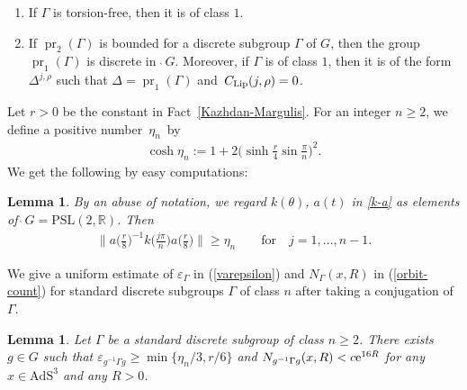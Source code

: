 \documentclass[10pt,a4paper]{amsart}
\numberwithin{equation}{section}
\newtheorem{Lemma}[Theorem]{Lemma}
\begin{document}
{\samepage\begin{Remark}\quad
\begin{enumerate}\itemsep=0pt
\item[(1)]
If $\Gamma$ is torsion-free, then it is of class $1$.
\item[(2)]
If $\operatorname{pr}_{2}(\Gamma)$ is bounded
for a discrete subgroup $\Gamma$ of $G$, then
the group $\operatorname{pr}_{1}(\Gamma)$ is discrete
in~$\grave{\ }G$.
Moreover, if $\Gamma$ is of class $1$, then it is of the form $\Delta^{j,\rho}$
such that $\Delta = \operatorname{pr}_{1}(\Gamma)$ and~$C_{\rm Lip}(j,\rho)=0$.
\end{enumerate}
\end{Remark}

}

Let $r>0$ be the constant in Fact~\ref{Kazhdan-Margulis}.
For an integer $n \geq 2$,
we define a positive num\-ber~$\eta_{n}$~by
\begin{gather*}
\cosh \eta_{n} :=1+2\bigg(\sinh \frac{r}{4} \sin \frac{\pi}{n}\bigg)^{2}.
\end{gather*}
We get the following by easy computations:
\begin{Lemma}
\label{computation}
By an abuse of notation, we regard $k(\theta)$, $a(t)$ in \eqref{k-a}
as elements of $\grave{\ }G=\mathrm{PSL}(2,\mathbb{R})$. Then
\begin{gather*}
\bigg\|a\bigg(\frac{r}{8}\bigg)^{-1}k\bigg(\frac{j\pi}{n}\bigg)a\bigg(\frac{r}{8}\bigg)\bigg\| \geq \eta_{n}\qquad
\text{for}\quad j=1,\ldots,n-1.
\end{gather*}
\end{Lemma}

We give a uniform estimate of $\varepsilon_{\Gamma}$ in (\ref{varepsilon})
and $N_{\Gamma}(x,R)$ in (\ref{orbit-count})
for standard discrete subgroups $\Gamma$ of class $n$
after taking a conjugation of $\Gamma$.

\begin{Lemma}
\label{n-standard}
Let $\Gamma$ be a standard discrete subgroup of class $n \geq 2$.
There exists $g\in G$ such that
$\varepsilon_{g^{-1}\Gamma g}\geq\operatorname{min}\{\eta_n/3,r/6\}$
and $N_{g^{-1}\Gamma g}(x,R)<c{\rm e}^{16R}$ for any $x\in \mathrm{AdS}^{3}$ and any $R>0$.
\end{Lemma}
\end{document}
